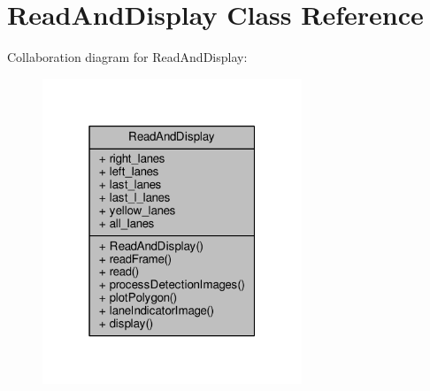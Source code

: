 \hypertarget{classReadAndDisplay}{}\section{Read\+And\+Display Class Reference}
\label{classReadAndDisplay}


Collaboration diagram for Read\+And\+Display\+:
\nopagebreak
\begin{figure}[H]
\begin{center}
\leavevmode
\includegraphics[width=220pt]{classReadAndDisplay__coll__graph}
\end{center}
\end{figure}
